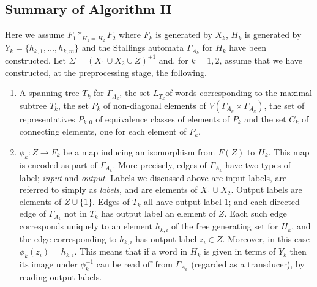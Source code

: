 \documentclass[a4paper,12pt]{article}
\newcommand{\G}{\Gamma }
\renewcommand{\S}{\Sigma }
\numberwithin{equation}{section}
\numberwithin{figure}{section}
\newcommand{\maps}{\rightarrow}
\newcommand{\be}{\begin{enumerate}}
\newcommand{\ee}{\end{enumerate}}
\begin{document}
\subsection{Summary of Algorithm II}
Here we assume $F_1*_{H_1=H_2} F_2$
 where $F_k$ is generated by $X_k$, $H_k$ is generated 
by $Y_k=\{h_{k,1},\ldots, h_{k,m}\}$ 
and the Stallings automata $\G_{A_k}$ for $H_k$ have
been constructed. Let  $\S=(X_1\cup X_2\cup Z)^{\pm 1}$ and, for $k=1,2$,  
assume that we have constructed, at the preprocessing stage, the following. 
\be
\item 
A spanning tree  $T_k$ for $\G_{A_k}$, 
 the set $L_{T_k}$of words corresponding to the  maximal subtree $T_k$, 
the set $P_k$ of non-diagonal elements of 
$V( \G_{A_k}\times \G_{A_k})$,   
 the set of representatives  $P_{k,0}$ of equivalence classes of 
elements of $P_k$ and the
set $C_k$ of connecting elements, one for each element of $P_k$.
\item $\phi_k:Z\maps F_k$ be a map inducing an isomorphism from $F(Z)$ to
$H_k$. This map is encoded as part of $\G_{A_k}$. More precisely, 
edges of $\G_{A_k}$ have two types of label; \emph{input} and \emph{output}.
Labels we discussed above are input labels, are 
referred to simply as \emph{labels}, and are elements of $X_1\cup X_2$. 
Output labels are elements of  $Z\cup \{1\}$.
 Edges of $T_k$  all have output label $1$; and each directed 
edge of $\G_{A_k}$ not in $T_k$ has output 
label an element of $Z$. Each such edge corresponds uniquely to
 an element $h_{k,i}$ of the free generating set for $H_k$, and the edge
corresponding to $h_{k,i}$ has 
 output label  $z_i\in Z$. Moreover, in this case $\phi_k(z_i)=h_{k,i}$.  
  This means that if a word in $H_k$ is given in terms of $Y_k$  then its
image under $\phi_k^{-1}$ can be read off from $\G_{A_k}$ (regarded as a
 transducer), by reading output labels. 
\ee
 
\end{document}
